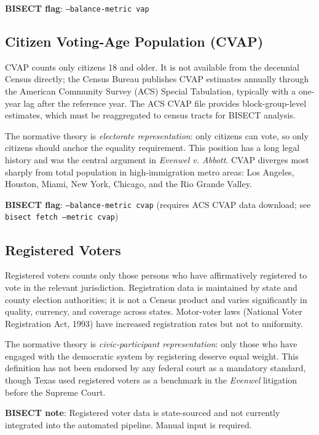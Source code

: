 \textbf{BISECT flag}: \texttt{--balance-metric vap}

\subsection{Citizen Voting-Age Population (CVAP)}

CVAP counts only citizens 18 and older. It is not available from the decennial Census directly; the Census Bureau publishes CVAP estimates annually through the American Community Survey (ACS) Special Tabulation, typically with a one-year lag after the reference year. The ACS CVAP file provides block-group-level estimates, which must be reaggregated to census tracts for BISECT analysis.

The normative theory is \emph{electorate representation}: only citizens can vote, so only citizens should anchor the equality requirement. This position has a long legal history and was the central argument in \emph{Evenwel v. Abbott}. CVAP diverges most sharply from total population in high-immigration metro areas: Los Angeles, Houston, Miami, New York, Chicago, and the Rio Grande Valley.

\textbf{BISECT flag}: \texttt{--balance-metric cvap} (requires ACS CVAP data download; see \texttt{bisect fetch --metric cvap})

\subsection{Registered Voters}

Registered voters counts only those persons who have affirmatively registered to vote in the relevant jurisdiction. Registration data is maintained by state and county election authorities; it is not a Census product and varies significantly in quality, currency, and coverage across states. Motor-voter laws (National Voter Registration Act, 1993) have increased registration rates but not to uniformity.

The normative theory is \emph{civic-participant representation}: only those who have engaged with the democratic system by registering deserve equal weight. This definition has not been endorsed by any federal court as a mandatory standard, though Texas used registered voters as a benchmark in the \emph{Evenwel} litigation before the Supreme Court.

\textbf{BISECT note}: Registered voter data is state-sourced and not currently integrated into the automated pipeline. Manual input is required.

